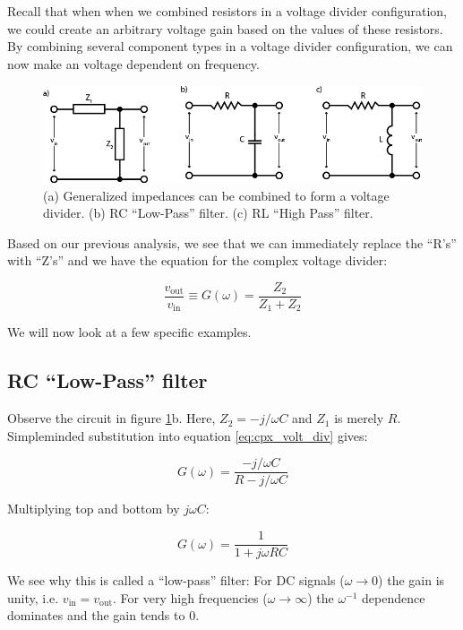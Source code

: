 \documentclass{tufte-book}
\begin{document}
Recall that when when we combined resistors in a voltage divider configuration, we could create an arbitrary voltage gain based on the values of these resistors. By combining several component types in a voltage divider configuration, we can now make an voltage dependent on frequency. 

\begin{figure}[h]
\caption{(a) Generalized impedances can be combined to form a voltage divider. (b) RC ``Low-Pass'' filter. (c) RL ``High Pass'' filter.}
\label{fig:cpx_volt_div}
\begin{center}
\includegraphics[width=\textwidth]{cpx_volt_div.png}
\end{center}
\end{figure}

Based on our previous analysis, we see that we can immediately replace the ``R's'' with ``Z's'' and we have the equation for the complex voltage divider:


\begin{equation}\label{eq:cpx_volt_div}
\frac{v_\text{out}}{v_\text{in}} \equiv G(\omega) = \frac{Z_2}{Z_1 + Z_2}
\end{equation}

\noindent We will now look at a few specific examples.

\subsection{RC ``Low-Pass'' filter}
Observe the circuit in figure \ref{fig:cpx_volt_div}b. Here, $Z_2 = -j/\omega C$ and $Z_1$ is merely $R$. Simpleminded substitution into equation \ref{eq:cpx_volt_div} gives:

$$
G(\omega) = \frac{-j/\omega C}{R - j/\omega C} 
$$

\noindent Multiplying top and bottom by $j\omega C$:

$$
G(\omega) = \frac{1}{1+j\omega RC}
$$

\noindent We see why this is called a ``low-pass'' filter: For DC signals ($\omega \rightarrow 0$) the gain is unity, i.e. $v_\text{in} =  v_\text{out}$. For very high frequencies ($\omega \rightarrow \infty$) the $\omega^{-1}$ dependence dominates and the gain tends to 0. 
\end{document}
